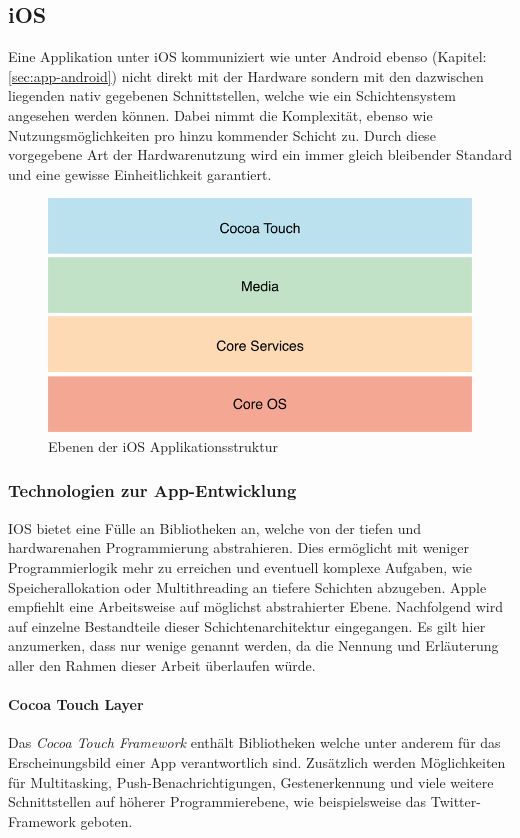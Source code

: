 \subsection{iOS}
	Eine Applikation unter iOS kommuniziert wie unter Android ebenso (Kapitel:
	\ref{sec:app-android}) nicht direkt mit der Hardware sondern mit den dazwischen
	liegenden nativ gegebenen Schnittstellen, welche wie ein Schichtensystem
	angesehen werden können. Dabei nimmt die Komplexität, ebenso wie
	Nutzungsmöglichkeiten pro hinzu kommender Schicht zu. Durch diese vorgegebene
	Art der Hardwarenutzung wird ein immer gleich bleibender Standard und eine
	gewisse Einheitlichkeit garantiert.
	\begin{figure}[h]
		\centering
		\includegraphics[width=0.5\linewidth]{ios/media/ios-layers.png}
		\caption{Ebenen der iOS Applikationsstruktur}
		\label{fig:marcetshare}
	\end{figure}
	
	\subsubsection{Technologien zur App-Entwicklung}
		IOS bietet eine Fülle an Bibliotheken an, welche von der tiefen und
		hardwarenahen Programmierung abstrahieren. Dies ermöglicht mit weniger
		Programmierlogik mehr zu erreichen und eventuell komplexe Aufgaben, wie
		Speicherallokation oder Multithreading an tiefere Schichten abzugeben.
		Apple empfiehlt eine Arbeitsweise auf möglichst abstrahierter Ebene.
		Nachfolgend wird auf einzelne Bestandteile dieser Schichtenarchitektur
		eingegangen. Es gilt hier anzumerken, dass nur wenige genannt werden, da die
		Nennung und Erläuterung aller den Rahmen dieser Arbeit überlaufen würde.
		\paragraph{Cocoa Touch Layer}
			Das \textsl{Cocoa Touch Framework} enthält Bibliotheken welche unter anderem
			für das Erscheinungsbild einer App verantwortlich sind. Zusätzlich werden
			Möglichkeiten für Multitasking, Push-Benachrichtigungen, Gestenerkennung und
			viele weitere Schnittstellen auf höherer Programmierebene, wie beispielsweise
			das Twitter-Framework geboten.
